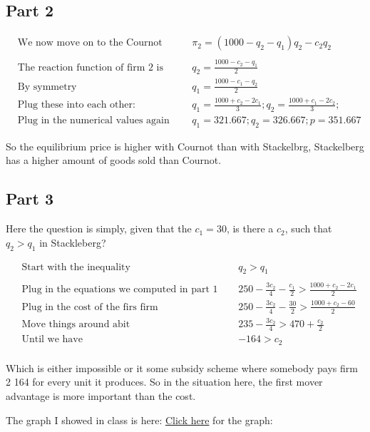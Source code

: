 \documentclass[12pt]{report}
\numberwithin{equation}{section}
\begin{document}
\subsection{Part 2}

\begin{align*}
&\text{We now move on to the Cournot} ~~ 
&& \pi_2=(1000-q_2-q_1)q_2 - c_2q_2 \\
\\
&\text{The reaction function of firm 2 is the same} ~~ 
&& q_2 =  \frac{1000-c_2-q_1}{2}
\\
&\text{By symmetry} ~~ 
&& q_1=  \frac{1000-c_1-q_2}{2}
\\
&\text{Plug these into each other:} ~~ 
&& q_1= \frac{1000+c_2-2c_1}{3}; q_2=  \frac{1000+c_1-2c_2}{3};
\\
&\text{Plug in the numerical values again} ~~ 
&& q_1=321.667 ; q_2=326.667; p =351.667
\end{align*}

So the equilibrium price is higher with Cournot than with Stackelbrg, Stackelberg has a higher amount of goods sold than Cournot. 

\subsection{Part 3}

Here the question is simply, given that the $c_1=30$, is there a $c_2$, such that $q_2>q_1$ in Stackleberg?


\begin{align*}
&\text{Start with the inequality} ~~ 
&& q_2 > q_1 \\
\\
&\text{Plug in the equations we computed in part 1} ~~ 
&& 250-\frac{3 c_2}{4}-\frac{c_1}{2} > \frac{1000+c_2-2c_1}{2}
\\
&\text{Plug in the cost of the firs firm} ~~ 
&& 250-\frac{3 c_2}{4}-\frac{30}{2} > \frac{1000+c_2-60}{2}
\\
&\text{Move things around abit} ~~ 
&& 235-\frac{3 c_2}{4} > 470+\frac{c_2}{2}
\\
&\text{Until we have} ~~ 
&& -164 > c_2
\\
\end{align*}

Which is either impossible or it some subsidy scheme where somebody pays firm 2 164 for every unit it produces. So in the situation here, the first mover advantage is more important than the cost. 

The graph I showed in class is here: \href{https://www.desmos.com/calculator/5vkmlhiwui}{Click here} for the graph: 
\end{document}
